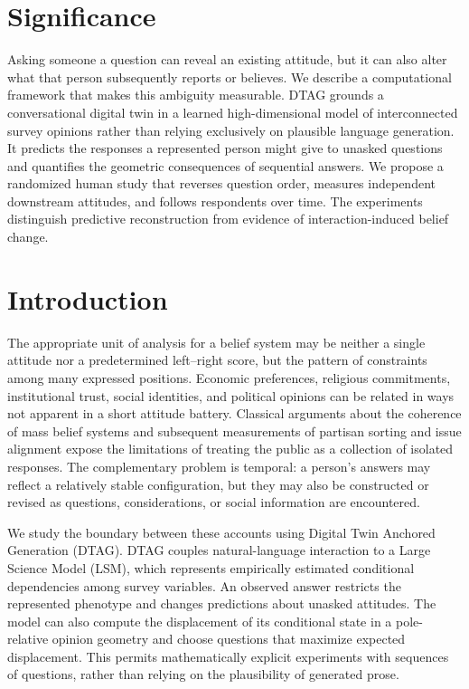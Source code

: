 \documentclass[journal,10pt]{IEEEtran}
\begin{document}
\section*{Significance}
Asking someone a question can reveal an existing attitude, but it can also alter what that person subsequently reports or believes. We describe a computational framework that makes this ambiguity measurable. DTAG grounds a conversational digital twin in a learned high-dimensional model of interconnected survey opinions rather than relying exclusively on plausible language generation. It predicts the responses a represented person might give to unasked questions and quantifies the geometric consequences of sequential answers. We propose a randomized human study that reverses question order, measures independent downstream attitudes, and follows respondents over time. The experiments distinguish predictive reconstruction from evidence of interaction-induced belief change.


\section{Introduction}
The appropriate unit of analysis for a belief system may be neither a single attitude nor a predetermined left--right score, but the pattern of constraints among many expressed positions. Economic preferences, religious commitments, institutional trust, social identities, and political opinions can be related in ways not apparent in a short attitude battery. Classical arguments about the coherence of mass belief systems \cite{converse1964,zaller1992} and subsequent measurements of partisan sorting and issue alignment \cite{baldassarri2008,dellaposta2015} expose the limitations of treating the public as a collection of isolated responses. The complementary problem is temporal: a person's answers may reflect a relatively stable configuration, but they may also be constructed or revised as questions, considerations, or social information are encountered.

We study the boundary between these accounts using Digital Twin Anchored Generation (DTAG). DTAG couples natural-language interaction to a Large Science Model (LSM), which represents empirically estimated conditional dependencies among survey variables. An observed answer restricts the represented phenotype and changes predictions about unasked attitudes. The model can also compute the displacement of its conditional state in a pole-relative opinion geometry and choose questions that maximize expected displacement. This permits mathematically explicit experiments with sequences of questions, rather than relying on the plausibility of generated prose.
\end{document}
